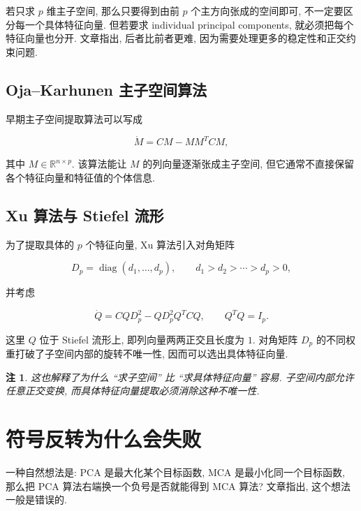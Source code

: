 \documentclass[oneside]{ctexart}
\newtheorem{remark}{注}[section]
\DeclareMathOperator{\diag}{diag}
\begin{document}
若只求 $p$ 维主子空间, 那么只要得到由前 $p$ 个主方向张成的空间即可, 不一定要区分每一个具体特征向量. 但若要求 individual principal components, 就必须把每个特征向量也分开. 文章指出, 后者比前者更难, 因为需要处理更多的稳定性和正交约束问题.

\subsection{Oja--Karhunen 主子空间算法}

早期主子空间提取算法可以写成

\begin{equation}
    \dot{M}=CM-MM^TCM,
\end{equation}

其中 $M\in\mathbb{R}^{n\times p}$. 该算法能让 $M$ 的列向量逐渐张成主子空间, 但它通常不直接保留各个特征向量和特征值的个体信息.

\subsection{Xu 算法与 Stiefel 流形}

为了提取具体的 $p$ 个特征向量, Xu 算法引入对角矩阵

\begin{equation}
    D_p=\diag(d_1,
\dots,d_p),
    \qquad d_1>d_2>\cdots>d_p>0,
\end{equation}

并考虑

\begin{equation}
    \dot{Q}=CQD_p^2-QD_p^2Q^TCQ,
    \qquad Q^TQ=I_p.
\end{equation}

这里 $Q$ 位于 Stiefel 流形上, 即列向量两两正交且长度为 $1$. 对角矩阵 $D_p$ 的不同权重打破了子空间内部的旋转不唯一性, 因而可以选出具体特征向量.

\begin{remark}
    这也解释了为什么 ``求子空间'' 比 ``求具体特征向量'' 容易. 子空间内部允许任意正交变换, 而具体特征向量提取必须消除这种不唯一性.
\end{remark}

\section{符号反转为什么会失败}

一种自然想法是: PCA 是最大化某个目标函数, MCA 是最小化同一个目标函数, 那么把 PCA 算法右端换一个负号是否就能得到 MCA 算法? 文章指出, 这个想法一般是错误的.
\end{document}
